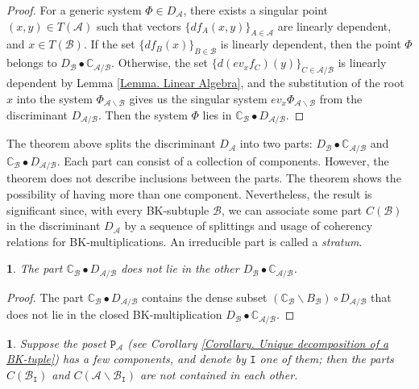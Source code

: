 \documentclass[11pt]{article}
\theoremstyle{plain}
\theoremstyle{definition}
\theoremstyle{remark}
\theoremstyle{plain}
\theoremstyle{plain}
\newtheorem{prop}[thm]{\protect\propositionname}
\theoremstyle{plain}
\newtheorem{cor}[thm]{\protect\corollaryname}
\theoremstyle{definition}
\providecommand{\corollaryname}{Corollary}
\providecommand{\propositionname}{Proposition}
\begin{document}
\begin{proof}
For a generic system $\Phi\in D_{\mathscr{A}}$, there exists a singular
point $(x,y)\in T(\mathscr{A})$ such that vectors $\{df_{A}(x,y)\}_{A\in\mathscr{A}}$
are linearly dependent, and $x\in T(\mathscr{B})$. If the set $\{df_{B}(x)\}_{B\in\mathscr{B}}$
is linearly dependent, then the point $\Phi$ belongs to $D_{\mathscr{B}}\bullet\mathbb{C}_{\mathscr{A}/\mathscr{B}}.$
Otherwise, the set $\{d(ev_{x}f_{C})(y)\}_{C\in\mathscr{A}/\mathscr{B}}$
is linearly dependent by Lemma \ref{Lemma. Linear Algebra}, and the
substitution of the root $x$ into the system $\Phi_{\mathscr{A}\backslash\mathscr{B}}$
gives us the singular system $ev_{x}\Phi_{\mathscr{A}\backslash\mathscr{B}}$
from the discriminant $D_{\mathscr{A}/\mathscr{B}}.$ Then the system
$\Phi$ lies in $\mathbb{C}_{\mathscr{B}}\bullet D_{\mathscr{A}/\mathscr{B}}$.
\end{proof}
The theorem above splits the discriminant $D_{\mathscr{A}}$ into
two parts: $D_{\mathscr{B}}\bullet\mathbb{C}_{\mathscr{A}/\mathscr{B}}$
and $\mathbb{C}_{\mathscr{B}}\bullet D_{\mathscr{A}/\mathscr{B}}$.
Each part can consist of a collection of components. However, the
theorem does not describe inclusions between the parts. The theorem
shows the possibility of having more than one component. Nevertheless,
the result is significant since, with every BK-subtuple $\mathscr{B}$,
we can associate some part $C(\mathscr{B})$ in the discriminant $D_{\mathscr{A}}$
by a sequence of splittings and usage of coherency relations for BK-multiplications.
An irreducible part is called a \textit{stratum}.
\begin{prop}
\label{Proposition. The second strata doesn't lie in the first}The
part $\mathbb{C}_{\mathscr{B}}\bullet D_{\mathscr{A}/\mathscr{B}}$
does not lie in the other $D_{\mathscr{B}}\bullet\mathbb{C}_{\mathscr{A}/\mathscr{B}}$.
\end{prop}

\begin{proof}
The part $\mathbb{C}_{\mathscr{B}}\bullet D_{\mathscr{A}/\mathscr{B}}$
contains the dense subset $(\mathbb{C}_{\mathscr{B}}\backslash B_{\mathscr{B}})\circ D_{\mathscr{A}/\mathscr{B}}$
that does not lie in the closed BK-multiplication $D_{\mathscr{B}}\bullet\mathbb{C}_{\mathscr{A}/\mathscr{B}}.$
\end{proof}
\begin{cor}
\label{Corollary. Component of a poset}Suppose the poset $\mathtt{P}_{\mathscr{A}}$
(see Corollary \ref{Corollary. Unique decomposition of a BK-tuple})
has a few components, and denote by $\mathtt{I}$ one of them; then
the parts $C(\mathscr{B}_{\mathtt{I}})$ and $C(\mathscr{A}\backslash\mathscr{B}_{\mathtt{I}})$
are not contained in each other.
\end{cor}
\end{document}
